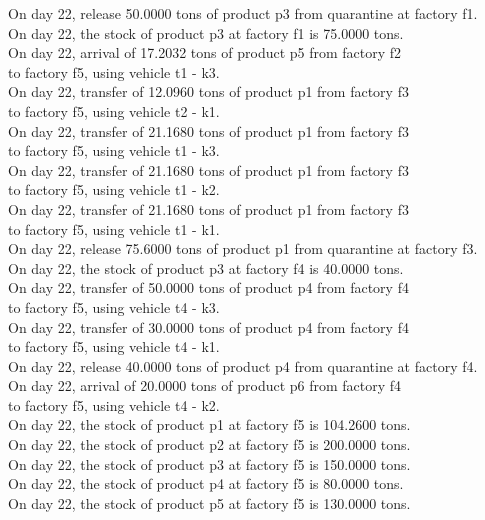 \begin{table}[H]
\begin{multicols}{2}
\begin{tabbing}
On day 22, release 50.0000 tons of product p3 from quarantine at factory f1. \\
On day 22, the stock of product p3 at factory f1 is 75.0000 tons. \\
On day 22, arrival of 17.2032 tons of product p5 from factory f2 \\ to factory f5, using vehicle t1 - k3. \\
On day 22, transfer of 12.0960 tons of product p1 from factory f3 \\ to factory f5, using vehicle t2 - k1. \\
On day 22, transfer of 21.1680 tons of product p1 from factory f3 \\ to factory f5, using vehicle t1 - k3. \\
On day 22, transfer of 21.1680 tons of product p1 from factory f3 \\ to factory f5, using vehicle t1 - k2. \\
On day 22, transfer of 21.1680 tons of product p1 from factory f3 \\ to factory f5, using vehicle t1 - k1. \\
On day 22, release 75.6000 tons of product p1 from quarantine at factory f3. \\
On day 22, the stock of product p3 at factory f4 is 40.0000 tons. \\
On day 22, transfer of 50.0000 tons of product p4 from factory f4 \\ to factory f5, using vehicle t4 - k3. \\
On day 22, transfer of 30.0000 tons of product p4 from factory f4 \\ to factory f5, using vehicle t4 - k1. \\
On day 22, release 40.0000 tons of product p4 from quarantine at factory f4. \\
On day 22, arrival of 20.0000 tons of product p6 from factory f4 \\ to factory f5, using vehicle t4 - k2. \\
On day 22, the stock of product p1 at factory f5 is 104.2600 tons. \\
On day 22, the stock of product p2 at factory f5 is 200.0000 tons. \\
On day 22, the stock of product p3 at factory f5 is 150.0000 tons. \\
On day 22, the stock of product p4 at factory f5 is 80.0000 tons. \\
On day 22, the stock of product p5 at factory f5 is 130.0000 tons. \\

\end{tabbing}
\end{multicols}
\end{table}
